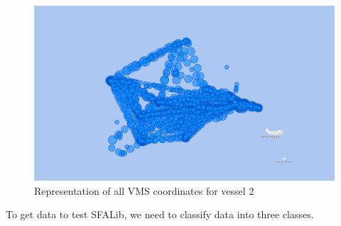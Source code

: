 \begin{figure}[H]
\centering
\includegraphics[width=0.8\linewidth]{Chapters/img/2All.pdf}
\caption{Representation of all VMS coordinates for vessel 2 }
\label{fig:bi_2_all}
\end{figure}
\newpage
To get data to test SFALib, we need to classify data into three classes.
